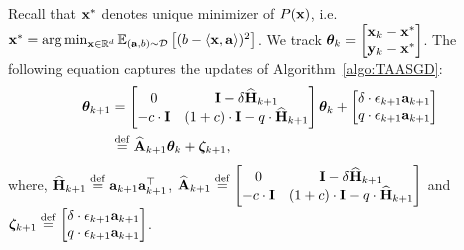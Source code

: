 Recall that $\xs$ denotes unique minimizer of $P(\x)$, i.e. $\xs=\arg\min_{\x \in \R^d} \Eover{\distr}{(b-\iprod{\x}{\a})^2}$. We track $\thetav_k=\begin{bmatrix}\x_k-\xs\\ \yt[k]-\xs\end{bmatrix}$. The following equation captures the updates of Algorithm~\ref{algo:TAASGD}:
\begin{align}
\label{eq:mainRec}
\thetav_{k+1}&=\begin{bmatrix}0&\eye-\delta\widehat{\H}_{k+1}\\-c\cdot\eye&(1+c)\cdot\eye-\g\cdot\widehat{\H}_{k+1}\end{bmatrix}\thetav_k
+\begin{bmatrix}\delta\cdot\epsilon_{k+1}\av_{k+1}\\\g\cdot\epsilon_{k+1}\av_{k+1}\end{bmatrix}\nonumber\\
&\defeq\Ah_{k+1}\thetav_{k}+\zetav_{k+1},
\end{align}
where, $\widehat{\H}_{k+1} \defeq \av_{k+1} \av_{k+1}^\top$, $\widehat{\A}_{k+1} \defeq \begin{bmatrix}0&\eye-\delta\widehat{\H}_{k+1}\\-c\cdot\eye&(1+c)\cdot\eye-\g\cdot\widehat{\H}_{k+1}\end{bmatrix}$ 
and $\zetav_{k+1} \defeq \begin{bmatrix}\delta\cdot\epsilon_{k+1}\av_{k+1}\\\g\cdot\epsilon_{k+1}\av_{k+1}\end{bmatrix}$.

